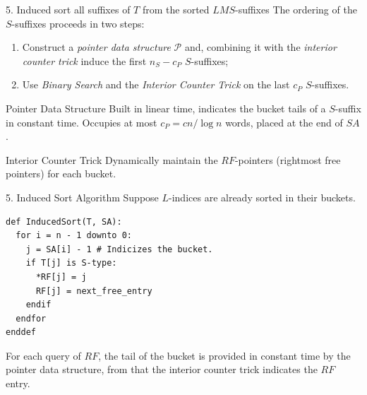 \documentclass{beamer}
\begin{document}
  \begin{frame}{5. Induced sort all suffixes of $T$ from the sorted $LMS$-suffixes}\label{5}
    The ordering of the $S$-suffixes proceeds in two steps:
    \begin{enumerate}
      \item Construct a \textit{pointer data structure} $\mathcal{P}$ and, combining it with the \textit{interior counter trick} induce the first $n_S - c_P$ $S$-suffixes;
      \item Use \textit{Binary Search} and the \textit{Interior Counter Trick} on the last $c_P$ $S$-suffixes.
    \end{enumerate}
    \pause
    \begin{block}{Pointer Data Structure}
      \vspace{1pt}
      Built in linear time, indicates the bucket tails of a $S$-suffix in constant time. Occupies at most $c_P = cn/\log n$ words, placed at the end of $SA$. \hyperlink{AUX5.pointer}{}
    \end{block}
    \begin{block}{Interior Counter Trick}
      \vspace{1pt}
      Dynamically maintain the $RF$-pointers (rightmost free pointers) for each bucket. \hyperlink{AUX5.counter}{}
    \end{block}
  \end{frame}


  \begin{frame}[fragile]{5. Induced Sort Algorithm}
    Suppose $L$-indices are already sorted in their buckets.
    \begin{lstlisting}
def InducedSort(T, SA):
  for i = n - 1 downto 0:
    j = SA[i] - 1 # Indicizes the bucket.
    if T[j] is S-type:
      *RF[j] = j
      RF[j] = next_free_entry
    endif
  endfor
enddef
    \end{lstlisting}

    For each query of $RF$, the tail of the bucket is provided in constant time by the pointer data structure, from that the interior counter trick indicates the $RF$ entry.
  \end{frame}
\end{document}
